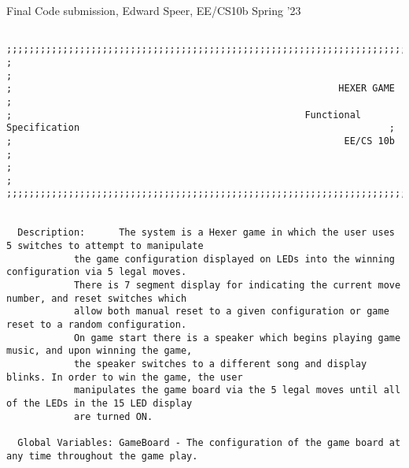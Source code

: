 \documentclass[12 pt]{article}
\begin{document}
Final Code submission, Edward Speer, EE/CS10b Spring '23
\tiny
\begin{verbatim}

;;;;;;;;;;;;;;;;;;;;;;;;;;;;;;;;;;;;;;;;;;;;;;;;;;;;;;;;;;;;;;;;;;;;;;;;;;;;;;;;;;;;;;;;;;;;;;;;;;;;;;;;;;;;;;;;;;;;;;;;;;;
;                                                                                                                         ;
;                          				                   HEXER GAME                                                                  ;
;                          			                 Functional Specification                                                       ;
;                                                           EE/CS 10b                                                   ;
;                                                                                                                         ;
;;;;;;;;;;;;;;;;;;;;;;;;;;;;;;;;;;;;;;;;;;;;;;;;;;;;;;;;;;;;;;;;;;;;;;;;;;;;;;;;;;;;;;;;;;;;;;;;;;;;;;;;;;;;;;;;;;;;;;;;;;;


  Description:  	The system is a Hexer game in which the user uses 5 switches to attempt to manipulate  
			the game configuration displayed on LEDs into the winning configuration via 5 legal moves.
			There is 7 segment display for indicating the current move number, and reset switches which
			allow both manual reset to a given configuration or game reset to a random configuration. 
			On game start there is a speaker which begins playing game music, and upon winning the game, 
			the speaker switches to a different song and display blinks. In order to win the game, the user 
			manipulates the game board via the 5 legal moves until all of the LEDs in the 15 LED display
			are turned ON.

  Global Variables:	GameBoard - The configuration of the game board at any time throughout the game play.



\end{verbatim}
\end{document}
